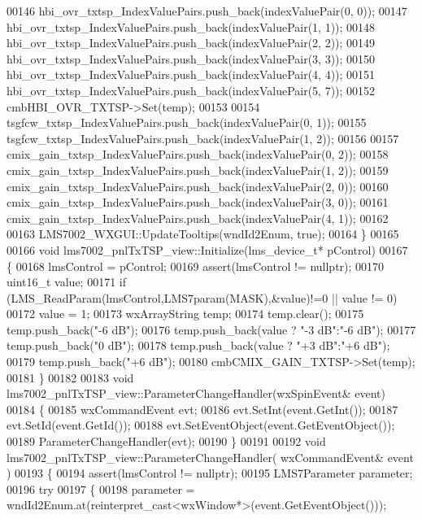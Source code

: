 \begin{DoxyCode}
{{00146     hbi_ovr_txtsp_IndexValuePairs.push\_back(indexValuePair(0, 0));
00147     hbi_ovr_txtsp_IndexValuePairs.push\_back(indexValuePair(1, 1));
00148     hbi_ovr_txtsp_IndexValuePairs.push\_back(indexValuePair(2, 2));
00149     hbi_ovr_txtsp_IndexValuePairs.push\_back(indexValuePair(3, 3));
00150     hbi_ovr_txtsp_IndexValuePairs.push\_back(indexValuePair(4, 4));
00151     hbi_ovr_txtsp_IndexValuePairs.push\_back(indexValuePair(5, 7));
00152     cmbHBI_OVR_TXTSP->Set(temp);
00153 
00154     tsgfcw_txtsp_IndexValuePairs.push\_back(indexValuePair(0, 1));
00155     tsgfcw_txtsp_IndexValuePairs.push\_back(indexValuePair(1, 2));
00156 
00157     cmix_gain_txtsp_IndexValuePairs.push\_back(indexValuePair(0, 2));
00158     cmix_gain_txtsp_IndexValuePairs.push\_back(indexValuePair(1, 2));
00159     cmix_gain_txtsp_IndexValuePairs.push\_back(indexValuePair(2, 0));
00160     cmix_gain_txtsp_IndexValuePairs.push\_back(indexValuePair(3, 0));
00161     cmix_gain_txtsp_IndexValuePairs.push\_back(indexValuePair(4, 1));
00162 
00163     LMS7002_WXGUI::UpdateTooltips(wndId2Enum, \textcolor{keyword}{true});
00164 \}
00165 
00166 \textcolor{keywordtype}{void} lms7002_pnlTxTSP_view::Initialize(lms_device_t* pControl)
00167 \{
00168     lmsControl = pControl;
00169     assert(lmsControl != \textcolor{keyword}{nullptr});
00170     uint16\_t value;
00171     \textcolor{keywordflow}{if} (LMS_ReadParam(lmsControl,LMS7param(MASK),&value)!=0  || value != 0)
00172          value = 1;
00173     wxArrayString temp;
00174     temp.clear();
00175     temp.push\_back(\textcolor{stringliteral}{"-6 dB"});
00176     temp.push\_back(value ? \textcolor{stringliteral}{"-3 dB"}:\textcolor{stringliteral}{"-6 dB"});
00177     temp.push\_back(\textcolor{stringliteral}{"0 dB"});
00178     temp.push\_back(value ? \textcolor{stringliteral}{"+3 dB"}:\textcolor{stringliteral}{"+6 dB"});
00179     temp.push\_back(\textcolor{stringliteral}{"+6 dB"});
00180     cmbCMIX_GAIN_TXTSP->Set(temp);
00181 \}
00182 
00183 \textcolor{keywordtype}{void} lms7002_pnlTxTSP_view::ParameterChangeHandler(wxSpinEvent& event)
00184 \{
00185     wxCommandEvent evt;
00186     evt.SetInt(event.GetInt());
00187     evt.SetId(event.GetId());
00188     evt.SetEventObject(event.GetEventObject());
00189     ParameterChangeHandler(evt);
00190 \}
00191 
00192 \textcolor{keywordtype}{void} lms7002_pnlTxTSP_view::ParameterChangeHandler( wxCommandEvent& event )
00193 \{
00194     assert(lmsControl != \textcolor{keyword}{nullptr});
00195     LMS7Parameter parameter;
00196     \textcolor{keywordflow}{try}
00197     \{
00198         parameter = wndId2Enum.at(reinterpret\_cast<wxWindow*>(event.GetEventObject()));
}}
\end{DoxyCode}
